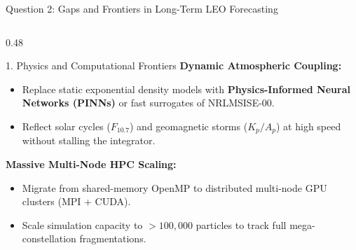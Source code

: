 \documentclass[aspectratio=169,10pt]{beamer}
\begin{document}
\begin{frame}{Question 2: Gaps and Frontiers in Long-Term LEO Forecasting}
    \begin{columns}[t]
        \begin{column}{0.48\textwidth}
            \begin{block}{1. Physics and Computational Frontiers}
                \small
                \textbf{Dynamic Atmospheric Coupling:}
                \begin{itemize}
                    \setlength{\itemsep}{2pt}
                    \item Replace static exponential density models with \textbf{Physics-Informed Neural Networks (PINNs)} or fast surrogates of NRLMSISE-00.
                    \item Reflect solar cycles ($F_{10.7}$) and geomagnetic storms ($K_p/A_p$) at high speed without stalling the integrator.
                \end{itemize}
                \vspace{0.12cm}
                \textbf{Massive Multi-Node HPC Scaling:}
                \begin{itemize}
                    \setlength{\itemsep}{2pt}
                    \item Migrate from shared-memory OpenMP to distributed multi-node GPU clusters (MPI + CUDA).
                    \item Scale simulation capacity to $>100,000$ particles to track full mega-constellation fragmentations.
                \end{itemize}
            \end{block}
        \end{column}


\end{columns}
\end{frame}
\end{document}
